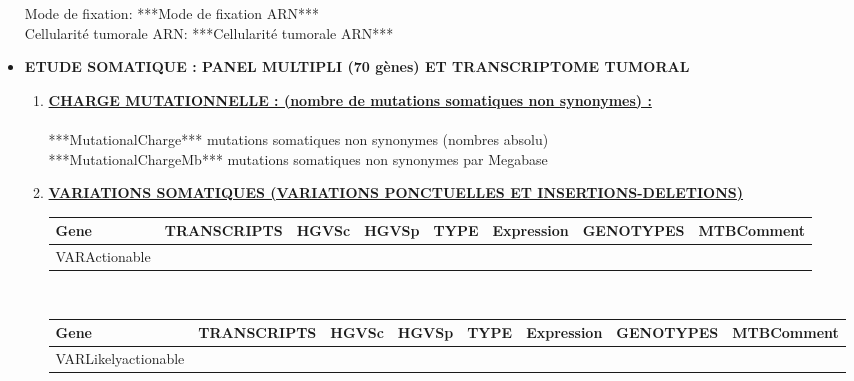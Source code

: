 \documentclass[10pt]{article}
\begin{document}
\begin{itemize}[font=\Large, label=, leftmargin=*, wide = 0pt]
Mode de fixation: ***Mode de fixation ARN***\\

Cellularité tumorale ARN: ***Cellularité tumorale ARN***\\


\newpage

\item \textbf{ETUDE SOMATIQUE : PANEL MULTIPLI (70 gènes) ET TRANSCRIPTOME TUMORAL}

\begin{enumerate}[leftmargin=*, label=\Roman*/, wide = 0pt]

\item \textbf{\underline{CHARGE MUTATIONNELLE : (nombre de mutations somatiques non synonymes) :}}
\\
\\
***MutationalCharge*** mutations somatiques non synonymes (nombres absolu)\\
***MutationalChargeMb*** mutations somatiques non synonymes par Megabase\\
\item \textbf{\underline{VARIATIONS SOMATIQUES (VARIATIONS PONCTUELLES ET INSERTIONS-DELETIONS)}}
\\
\begin{itemize} [font=\large, label=, leftmargin=*, wide = 0pt]
\begin{tabulary}{\textwidth}{|p{1.5cm}|p{2cm}|p{1.5cm}|p{1.5cm}|p{1.5cm}|p{1.5cm}|p{1.5cm}|p{4cm}|}
\hline
\scriptsize Gene &\scriptsize TRANSCRIPTS &\scriptsize HGVSc &\scriptsize HGVSp &\scriptsize TYPE &\scriptsize Expression &\scriptsize GENOTYPES &\scriptsize MTBComment\tabularnewline
\hline
VARActionable
\end{tabulary}\\

\begin{tabulary}{\textwidth}{|p{1.5cm}|p{2cm}|p{1.5cm}|p{1.5cm}|p{1.5cm}|p{1.5cm}|p{1.5cm}|p{4cm}|}
\hline
\scriptsize Gene &\scriptsize TRANSCRIPTS &\scriptsize HGVSc &\scriptsize HGVSp &\scriptsize TYPE &\scriptsize Expression &\scriptsize GENOTYPES &\scriptsize MTBComment\tabularnewline
\hline
VARLikelyactionable
\end{tabulary}\\


\end{itemize}
\end{enumerate}
\end{itemize}
\end{document}

